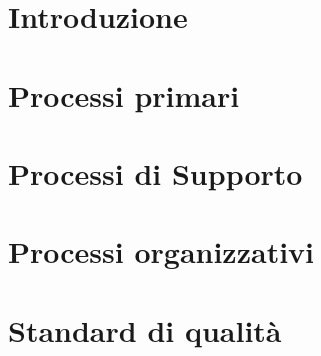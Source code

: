 \documentclass{article}
\begin{document}


\section{Introduzione}%
\label{sec:introduzione}


\newpage

\section{Processi primari}%
\label{sec:processi-primari}


\newpage

\section{Processi di Supporto}%
\label{sec:processi-di-supporto}


\newpage

\section{Processi organizzativi}%
\label{sec:processi-organizzativi}


\newpage

\appendix
\section{Standard di qualità}

\end{document}
